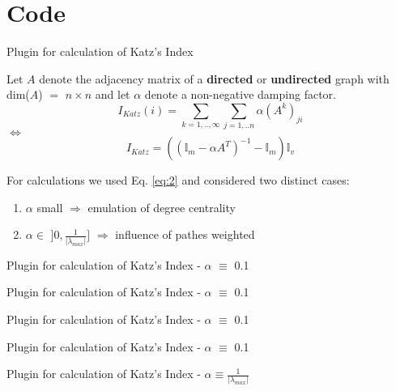 \section{Code}
\begin{frame}{Plugin for calculation of Katz's Index}
\begin{definition}
Let $A$ denote the adjacency matrix of a \textbf{directed} or \textbf{undirected} graph with dim($A$) $=$ $n \times n$ and let $\alpha$ denote a non-negative damping factor.
\begin{equation}
I_{Katz}(i) = \sum_{k=1,..,\infty} \sum_{j=1,..n} \alpha(A^k)_{ji}
\end{equation}
$\Leftrightarrow$
\begin{equation}\label{eq:2}
I_{Katz} = ((\mathbb{I}_m - \alpha A^T)^ {-1} - \mathbb{I}_m) \mathbb{I}_v
\end{equation}
\end{definition}
For calculations we used Eq. \ref{eq:2} and considered two distinct cases:
\begin{enumerate}
\item $\alpha$ small $\Rightarrow$ emulation of degree centrality
\item $\alpha \in$ $]0,\frac{1}{|\lambda_{max}|}]$ $\Rightarrow$ influence of pathes weighted
\end{enumerate}
\end{frame}
\begin{frame}{Plugin for calculation of Katz's Index - $\alpha$ $\equiv$ 0.1}

\end{frame}
\begin{frame}{Plugin for calculation of Katz's Index - $\alpha$ $\equiv$ 0.1}

\end{frame}
\begin{frame}{Plugin for calculation of Katz's Index - $\alpha$ $\equiv$ 0.1}

\end{frame}
\begin{frame}{Plugin for calculation of Katz's Index - $\alpha$ $\equiv$ 0.1}

\end{frame}
\begin{frame}{Plugin for calculation of Katz's Index - $\alpha \equiv \frac{1}{|\lambda_{max}|}$}

\end{frame}

